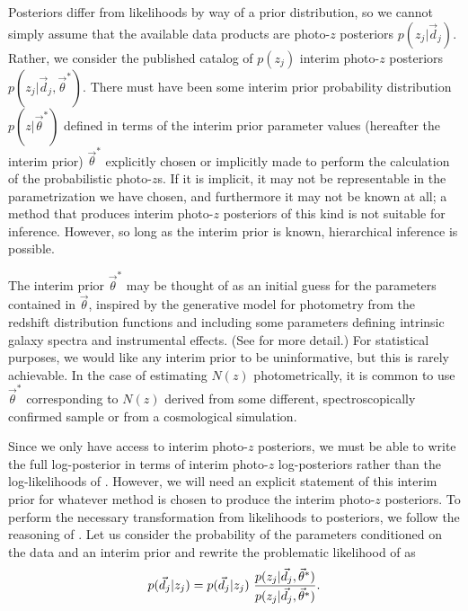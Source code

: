 Posteriors differ from likelihoods by way of a prior distribution, so we cannot simply assume that the available data products are photo-$z$ posteriors $p(z_{j}|\vec{d}_{j})$.  
Rather, we consider the published catalog of $p(z_{j})$ interim photo-$z$ posteriors $p(z_{j}|\vec{d}_{j},\vec{\theta}^{*})$.  
There must have been some interim prior probability distribution $p(z|\vec{\theta}^{*})$ defined in terms of the interim prior parameter values (hereafter the interim prior) $\vec{\theta}^{*}$ explicitly chosen or implicitly made to perform the calculation of the probabilistic photo-$z$s.  
If it is implicit, it may not be representable in the parametrization we have chosen, and furthermore it may not be known at all; a method that produces interim photo-$z$ posteriors of this kind is not suitable for inference.  
However, so long as the interim prior is known, hierarchical inference is possible. 

The interim prior $\vec{\theta}^{*}$ may be thought of as an initial guess for the parameters contained in $\vec{\theta}$, inspired by the generative model for photometry from the redshift distribution functions and including some parameters defining intrinsic galaxy spectra and instrumental effects. 
(See \citealt{Benitez2000} for more detail.)  
For statistical purposes, we would like any interim prior to be uninformative, but this is rarely achievable.  
In the case of estimating $N(z)$ photometrically, it is common to use $\vec{\theta}^{*}$ corresponding to $N(z)$ derived from some different, spectroscopically confirmed sample or from a cosmological simulation.

Since we only have access to interim photo-$z$ posteriors, we must be able to write the full log-posterior in terms of interim photo-$z$ log-posteriors rather than the log-likelihoods of .  However, we will need an explicit statement of this interim prior for whatever method is chosen to produce the interim photo-$z$ posteriors.  
To perform the necessary transformation from likelihoods to posteriors, we follow the reasoning of \citet{Foreman-Mackey2014}.  
Let us consider the probability of the parameters conditioned on the data and an interim prior and rewrite the problematic likelihood of  as 
\begin{equation}
\eqlabel{eq:trick}
p(\vec{d}_{j}|z_{j}) = p(\vec{d}_{j}|z_{j})\ \frac{p(z_{j}|\vec{d}_{j},\vec{\theta}^{*})}{p(z_{j}|\vec{d}_{j},\vec{\theta}^{*})}.
\end{equation}

